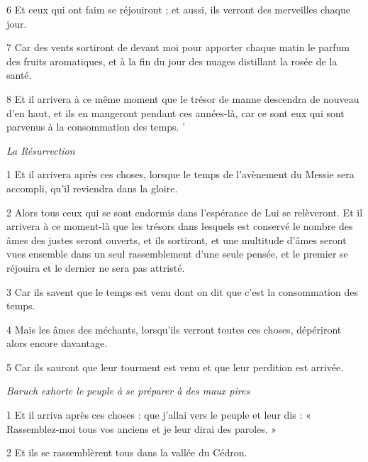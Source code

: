 \par 6 Et ceux qui ont faim se réjouiront ; et aussi, ils verront des merveilles chaque jour.

\par 7 Car des vents sortiront de devant moi pour apporter chaque matin le parfum des fruits aromatiques, et à la fin du jour des nuages ​​distillant la rosée de la santé.

\par 8 Et il arrivera à ce même moment que le trésor de manne descendra de nouveau d'en haut, et ils en mangeront pendant ces années-là, car ce sont eux qui sont parvenus à la consommation des temps. '


\par \textit{La Résurrection}

\par 1 Et il arrivera après ces choses, lorsque le temps de l'avènement du Messie sera accompli, qu'il reviendra dans la gloire.

\par 2 Alors tous ceux qui se sont endormis dans l'espérance de Lui se relèveront. Et il arrivera à ce moment-là que les trésors dans lesquels est conservé le nombre des âmes des justes seront ouverts, et ils sortiront, et une multitude d'âmes seront vues ensemble dans un seul rassemblement d'une seule pensée, et le premier se réjouira et le dernier ne sera pas attristé.

\par 3 Car ils savent que le temps est venu dont on dit que c'est la consommation des temps.

\par 4 Mais les âmes des méchants, lorsqu'ils verront toutes ces choses, dépériront alors encore davantage.

\par 5 Car ils sauront que leur tourment est venu et que leur perdition est arrivée.


\par \textit{Baruch exhorte le peuple à se préparer à des maux pires}

\par 1 Et il arriva après ces choses : que j'allai vers le peuple et leur dis : « Rassemblez-moi tous vos anciens et je leur dirai des paroles. »

\par 2 Et ils se rassemblèrent tous dans la vallée du Cédron.

